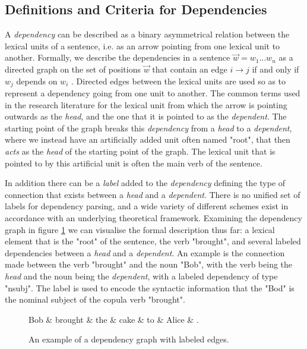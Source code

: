 \subsection{Definitions and Criteria for Dependencies}
\label{definitions}
A \textit{dependency} can be described as a binary asymmetrical relation between the lexical units of a sentence, i.e. as an arrow pointing from one lexical unit to another. Formally, we describe the dependencies in a sentence $\vec{w} = w_1 ... w_n$ as a directed graph on the set of positions $\vec{w}$ that contain an edge $i \rightarrow j$ if and only if $w_j$ depends on $w_i$ \cite{Kuhl:10}. Directed edges between the lexical units are used so as to represent a dependency going from one unit to another. The common terms used in the research literature for the lexical unit from which the arrow is pointing outwards as the \textit{head}, and the one that it is pointed to as the \textit{dependent}. The starting point of the graph breaks this \textit{dependency} from a \textit{head} to a \textit{dependent}, where we instead have an artificially added unit often named "root", that then \textit{acts} as the \textit{head} of the starting point of the graph. The lexical unit that is pointed to by this artificial unit is often the main verb of the sentence.

In addition there can be a \textit{label} added to the \textit{dependency} defining the type of connection that exists between a \textit{head} and a \textit{dependent}. There is no unified set of labels for dependency parsing, and a wide variety of different schemes exist in accordance with an underlying theoretical framework. Examining the dependency graph in figure \ref{dep1} we can visualise the formal description thus far: a lexical element that is the "root" of the sentence, the verb "brought", and several labeled dependencies between a \textit{head} and a \textit{dependent}. An example is the connection made between the verb "brought" and the noun "Bob", with the verb being the \textit{head} and the noun being the \textit{dependent}, with a labeled dependency of type "nsubj". The label is used to encode the syntactic information that the "Bod" is the nominal subject of the copula verb "brought".

\begin{figure}
    \begin{dependency}[]
        \begin{deptext}[column sep=1em, row sep=.1ex]
            Bob \& brought \& the \& cake \& to \& Alice \& . \\
        \end{deptext}
    \end{dependency}
    \caption{An example of a dependency graph with labeled edges.}
    \label{dep1}
\end{figure}

